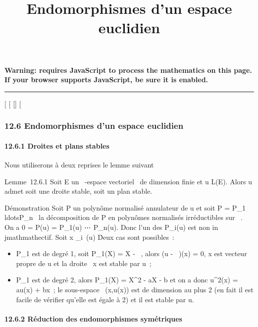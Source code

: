 \documentclass[]{article}
\title{Endomorphismes d'un espace euclidien}
\author{}
\date{}
\begin{document}
\maketitle

\textbf{Warning: 
requires JavaScript to process the mathematics on this page.\\ If your
browser supports JavaScript, be sure it is enabled.}

\begin{center}\rule{3in}{0.4pt}\end{center}

{[}
{[}
{[}{]}
{[}

\subsubsection{12.6 Endomorphismes d'un espace euclidien}

\paragraph{12.6.1 Droites et plans stables}

Nous utiliserons à deux reprises le lemme suivant

Lemme~12.6.1 Soit E un ~-espace vectoriel ~de dimension finie et u \in
L(E). Alors u admet soit une droite stable, soit un plan stable.

Démonstration Soit P un polynôme normalisé annulateur de u et soit P =
P_1\\ldotsP_n~
la décomposition de P en polynômes normalisés irréductibles sur ~. On a
0 = P(u) = P_1(u) \cdot⋯ \cdot
P_n(u). Donc l'un des P_i(u) est non in\\jmathmathectif. Soit x
\in\mathrmKerP_i~(u)
\diagdown\0\. Deux cas sont possibles~:

\begin{itemize}
\itemsep1pt\parskip0pt
\item
  P_1 est de degré 1, soit P_1(X) = X - \lambda~, alors (u -
  \lambda~\mathrmId)(x) = 0, x est vecteur propre de u et la
  droite ~x est stable par u~;
\item
  P_1 est de degré 2, alors P_1(X) = X^2 -
  aX - b et on a donc u^2(x) = au(x) + bx~; le sous-espace
  \mathrmVect~(x,u(x)) est
  de dimension au plus 2 (en fait il est facile de vérifier qu'elle est
  égale à 2) et il est stable par u.
\end{itemize}

\paragraph{12.6.2 Réduction des endomorphismes symétriques}
\end{document}
